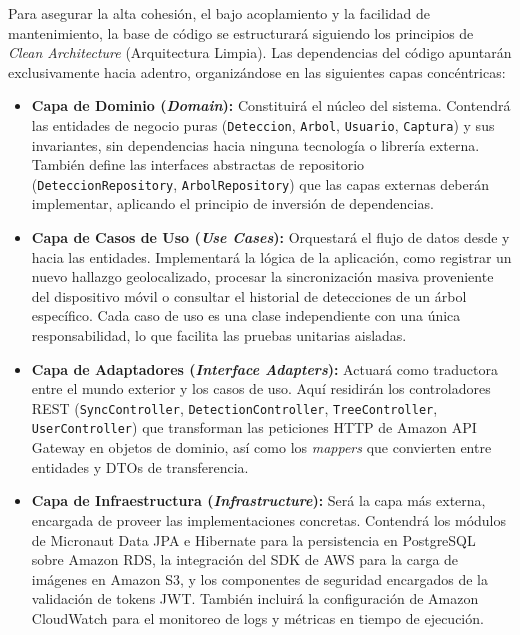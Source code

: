 Para asegurar la alta cohesión, el bajo acoplamiento y la facilidad de
mantenimiento, la base de código se estructurará siguiendo los principios
de \textit{Clean Architecture} (Arquitectura Limpia). Las dependencias del
código apuntarán exclusivamente hacia adentro, organizándose en las
siguientes capas concéntricas:

\begin{itemize}
    \item \textbf{Capa de Dominio (\textit{Domain}):} Constituirá el núcleo
    del sistema. Contendrá las entidades de negocio puras (\texttt{Deteccion},
    \texttt{Arbol}, \texttt{Usuario}, \texttt{Captura}) y sus invariantes,
    sin dependencias hacia ninguna tecnología o librería externa. También
    define las interfaces abstractas de repositorio (\texttt{DeteccionRepository},
    \texttt{ArbolRepository}) que las capas externas deberán implementar,
    aplicando el principio de inversión de dependencias.

    \item \textbf{Capa de Casos de Uso (\textit{Use Cases}):} Orquestará
    el flujo de datos desde y hacia las entidades. Implementará la lógica
    de la aplicación, como registrar un nuevo hallazgo geolocalizado,
    procesar la sincronización masiva proveniente del dispositivo móvil o
    consultar el historial de detecciones de un árbol específico. Cada caso
    de uso es una clase independiente con una única responsabilidad, lo que
    facilita las pruebas unitarias aisladas.

    \item \textbf{Capa de Adaptadores (\textit{Interface Adapters}):} Actuará
    como traductora entre el mundo exterior y los casos de uso. Aquí residirán
    los controladores REST (\texttt{SyncController}, \texttt{DetectionController},
    \texttt{TreeController}, \texttt{UserController}) que transforman las
    peticiones HTTP de Amazon API Gateway en objetos de dominio, así como
    los \textit{mappers} que convierten entre entidades y DTOs de transferencia.

    \item \textbf{Capa de Infraestructura (\textit{Infrastructure}):} Será
    la capa más externa, encargada de proveer las implementaciones concretas.
    Contendrá los módulos de Micronaut Data JPA e Hibernate para la persistencia
    en PostgreSQL sobre Amazon RDS, la integración del SDK de AWS para la
    carga de imágenes en Amazon S3, y los componentes de seguridad encargados
    de la validación de tokens JWT. También incluirá la configuración de
    Amazon CloudWatch para el monitoreo de logs y métricas en tiempo de
    ejecución.
\end{itemize}

